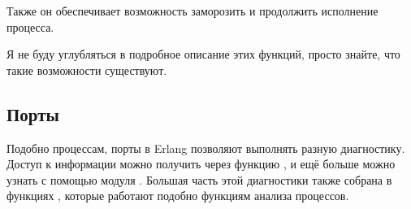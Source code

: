 Также он обеспечивает возможность заморозить и продолжить исполнение процесса.

Я не буду углубляться в подробное описание этих функций, просто знайте, что такие возможности существуют.


\subsection{Порты}

Подобно процессам, порты в Erlang позволяют выполнять разную диагностику. Доступ к информации можно получить через функцию , и ещё больше можно узнать с помощью модуля . Большая часть этой диагностики также собрана в функциях , которые работают подобно функциям анализа процессов.

